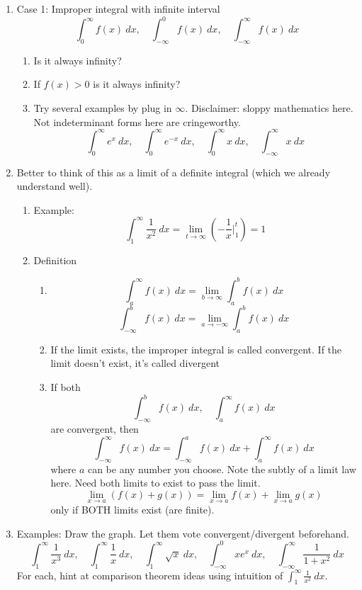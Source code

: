 \documentclass{article}
\begin{document}
\begin{enumerate}
\item Case 1: Improper integral with infinite interval
$$
\int_0^\infty f(x)~dx, \quad
\int_{-\infty}^0 f(x)~dx,\quad 
\int_{-\infty}^\infty f(x)~dx
$$
\begin{enumerate}
\item Is it always infinity?
\item If $f(x)>0$ is it always infinity?
\item Try several examples by plug in $\infty$. Disclaimer: sloppy mathematics here. Not indeterminant forms here are cringeworthy.
\[
\int_0^{\infty} e^x~dx, \quad 
\int_0^{\infty} e^{-x}~dx, \quad 
\int_0^{\infty} x~dx,  \quad 
\int_{-\infty}^{\infty} x~dx
\]
\end{enumerate}

\item Better to think of this as a limit of a definite integral (which we already understand well).
\begin{enumerate}
\item Example: 
$$
\int_1^\infty \frac{1}{x^2}~dx = \lim_{t\rightarrow \infty}\left(-\frac{1}{x}\Big|_1^t\right) = 1
$$ 

\item Definition
\begin{enumerate}
\item 
$$
\int_a^\infty f(x)~dx  = \lim_{b\rightarrow \infty}\int_a^bf(x)~dx
$$
$$
\int_{-\infty}^b f(x)~dx  = \lim_{a\rightarrow -\infty}\int_a^bf(x)~dx
$$
\item If the limit exists, the improper integral is called convergent. If the limit doesn't exist, it's called divergent
\item If both 
$$
\int_{-\infty}^b f(x)~dx, \quad\int_a^\infty f(x)~dx
$$
are convergent, then
$$
\int_{-\infty}^\infty f(x)~dx = \int_{-\infty}^a f(x)~dx+\int_a^\infty f(x)~dx
$$
where $a$ can be any number you choose. Note the subtly of a limit law here. Need both limits to exist to pass the limit.
\[
\lim_{x\rightarrow a} (f(x)+g(x)) = \lim_{x\rightarrow a} f(x)+ \lim_{x\rightarrow a} g(x)
\]
only if BOTH limits exist (are finite).
\end{enumerate}
\end{enumerate}

\item Examples: Draw the graph. Let them vote convergent/divergent beforehand.
$$
\int_1^\infty \frac{1}{x^3}~dx, \quad
\int_1^\infty \frac{1}{x}~dx, \quad
\int_1^\infty \sqrt{x}~dx, 
\quad\int_{-\infty}^0xe^x~dx, 
\quad\int_{-\infty}^\infty \frac{1}{1+x^2}~dx
$$
For each, hint at comparison theorem ideas using intuition of $\int_1^{\infty} \frac{1}{x^2}~dx$. 


\end{enumerate}
\end{document}
